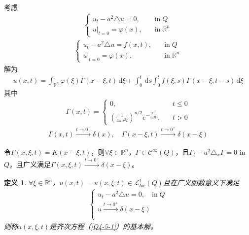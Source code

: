 \documentclass[11pt, a4paper]{article}
\theoremstyle{theorem}
\newtheorem{definition}[thm]{定义}
\newcommand{\intd}[1]{\,\mathrm{d}{#1}}
\begin{document}
考虑
\begin{align}
\label{Q4-5-1}
    \begin{cases}
    u_t - a^2\triangle u = 0, \quad &\text{in} \; Q \\
    u\bigg|_{t = 0} = \varphi(x), \quad &\text{in} \; \mathbb{R}^n
    \end{cases}
\end{align}
\begin{align}
\label{Q4-5-2}
    \begin{cases}
    u_t - a^2\triangle u = f(x,t), \quad &\text{in} \; Q \\
    u\bigg|_{t = 0} = \varphi(x), \quad &\text{in} \; \mathbb{R}^n
    \end{cases}
\end{align}
解为
\begin{align*}
    u(x,t) = \int_{\mathbb{R}^n} \varphi(\xi) \Gamma(x - \xi,t) \intd \xi + \int_0^t \intd s \int_0^t f(\xi, s) \Gamma(x - \xi, t - s) \intd \xi
\end{align*}
其中
\begin{align*}
    \Gamma(x,t) = \begin{cases}
    0, \quad &t \leq 0 \\
    \left(\frac{1}{4\pi a^2 t}\right)^{n/2} e^{-\frac{|x|^2}{4a^2t}}, \quad &t > 0
    \end{cases}
\end{align*}
$$
\Gamma(x,t) \xrightarrow[]{t \rightarrow 0^+} \delta(x), \quad \Gamma(x - \xi,t) \xrightarrow[]{t \rightarrow 0^+} \delta(x - \xi)
$$

令$\Gamma(x,\xi, t) = K(x - \xi, t)$，则$\forall \xi \in \mathbb{R}^n$，$\Gamma \in \mathcal{C}^\infty(Q)$，且$\Gamma_t - a^2 \triangle_x \Gamma = 0$ in $Q$，且广义满足$\Gamma(x,\xi,t) \xrightarrow[]{t \rightarrow 0^+} \delta(x - \xi)$。

\begin{definition}
$\forall \xi \in \mathbb{R}^n$，$u(x,t) = u(x,\xi,t) \in \mathcal{L}^1_{loc}(Q)$且在广义函数意义下满足
\begin{align}
    \begin{cases}
      u_t - a^2 \triangle u = 0, \quad \text{in} \; Q \\
      u \xrightarrow[]{t \rightarrow 0^+} \delta(x - \xi) \\
    \end{cases}
\end{align}
则称$u(x,\xi,t)$是齐次方程（\ref{Q4-5-1}）的基本解。
\end{definition}
\end{document}
